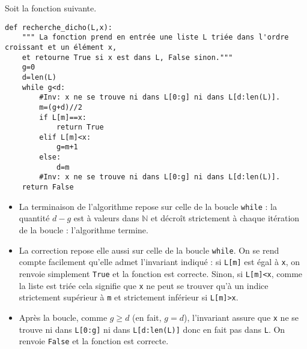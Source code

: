 %
Soit la fonction suivante.
\begin{lstlisting}
def recherche_dicho(L,x):
    """ La fonction prend en entrée une liste L triée dans l'ordre croissant et un élément x,
    et retourne True si x est dans L, False sinon."""
    g=0
    d=len(L)
    while g<d:
        #Inv: x ne se trouve ni dans L[0:g] ni dans L[d:len(L)].
        m=(g+d)//2
        if L[m]==x:
            return True
        elif L[m]<x:
            g=m+1
        else:
            d=m
        #Inv: x ne se trouve ni dans L[0:g] ni dans L[d:len(L)].
    return False
\end{lstlisting}

\ifprof
\begin{corrige}
\begin{itemize}
\item La terminaison de l’algorithme repose sur celle de la boucle \texttt{while} : la quantité $d-g$ est à valeurs dans $\mathbb{N}$ et
décroît strictement à chaque itération de la boucle : l’algorithme termine.
\item La correction repose elle aussi sur celle de la boucle \texttt{while}. On se rend compte facilement qu’elle admet l’invariant
indiqué : si \texttt{L[m]} est égal à \texttt{x}, on renvoie simplement \texttt{True} et la fonction est correcte. Sinon, si \texttt{L[m]<x}, comme
la liste est triée cela signifie que \texttt{x} ne peut se trouver qu’à un indice strictement supérieur à \texttt{m} et strictement
inférieur si \texttt{L[m]>x}.
\item  Après la boucle, comme $g\geq d$ (en fait, $g = d$), l’invariant assure que \texttt{x} ne se trouve ni dans \texttt{L[0:g]} ni dans
\texttt{L[d:len(L)]} donc en fait pas dans \texttt{L}. On renvoie \texttt{False} et la fonction est correcte.
\end{itemize}
\end{corrige}
\else
\fi